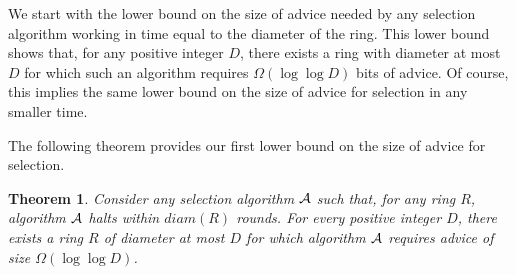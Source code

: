 \documentclass[11pt]{article}
\newtheorem{theorem}{Theorem}[section]
\newcommand{\algname}{\ensuremath{{\cal A}}}
\newcommand{\diam}[1]{\ensuremath{{diam}(#1)}}
\begin{document}
We start with the lower bound on the size of advice needed by any selection algorithm working in time equal to the diameter of the ring.
This lower bound shows that, for any positive integer $D$, there exists a ring with diameter at most $D$ for which such an algorithm requires 
$\Omega(\log\log D)$ bits of advice. Of course, this implies the same lower bound on the size of advice for selection in any smaller time.


The following theorem provides our first lower bound on the size of advice for selection. 

\begin{theorem}\label{lb1}
Consider any selection algorithm $\algname$ such that, for any ring $R$, algorithm $\algname$ halts within $\diam{R}$ rounds. For every positive integer $D$, there exists a ring $R$ of diameter at most $D$ for which algorithm $\algname$ requires advice of size $\Omega(\log\log D)$.
\end{theorem}
\end{document}
